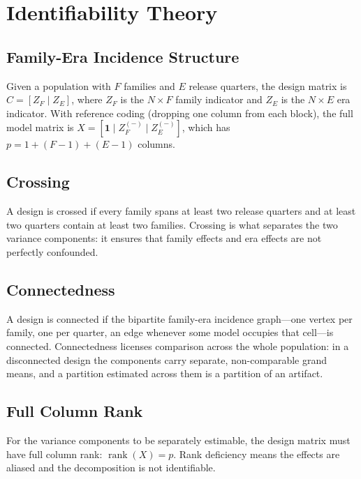 \documentclass[journal]{IEEEtran}
\begin{document}
\section{Identifiability Theory}

\subsection{Family-Era Incidence Structure}

Given a population with $F$ families and $E$ release quarters, the design matrix is $C = [Z_F \mid Z_E]$, where $Z_F$ is the $N \times F$ family indicator and $Z_E$ is the $N \times E$ era indicator. With reference coding (dropping one column from each block), the full model matrix is $X = [\mathbf{1} \mid Z_F^{(-)} \mid Z_E^{(-)}]$, which has $p = 1 + (F-1) + (E-1)$ columns.

\subsection{Crossing}

A design is crossed if every family spans at least two release quarters and at least two quarters contain at least two families. Crossing is what separates the two variance components: it ensures that family effects and era effects are not perfectly confounded.

\subsection{Connectedness}

A design is connected if the bipartite family-era incidence graph---one vertex per family, one per quarter, an edge whenever some model occupies that cell---is connected. Connectedness licenses comparison across the whole population: in a disconnected design the components carry separate, non-comparable grand means, and a partition estimated across them is a partition of an artifact.

\subsection{Full Column Rank}

For the variance components to be separately estimable, the design matrix must have full column rank: $\operatorname{rank}(X) = p$. Rank deficiency means the effects are aliased and the decomposition is not identifiable.
\end{document}
